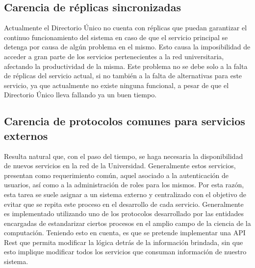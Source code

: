 \subsection{Carencia de r\'eplicas sincronizadas }

Actualmente el Directorio \'Unico no cuenta con r\'eplicas que puedan garantizar el continuo funcionamiento del sistema en caso de que el servicio principal se detenga por causa de alg\'un problema en el mismo. Esto causa la imposibilidad de acceder a gran parte de los servicios pertenecientes a la red universitaria, afectando la productividad de la misma.
Este problema no se debe solo a la falta de r\'eplicas del servicio actual, si no tambi\'en a la falta de alternativas para este servicio, ya que actualmente no existe ninguna funcional, a pesar de que el Directorio \'Unico lleva fallando ya un buen tiempo.

\subsection{Carencia de protocolos comunes para servicios externos}

Resulta natural que, con el paso del tiempo, se haga necesaria la disponibilidad de nuevos servicios en la red de la Universidad. Generalmente estos servicios, presentan como requerimiento com\'un, aquel asociado a la autenticaci\'on de usuarios, as\'i como a la administraci\'on de roles para los mismos. Por esta raz\'on, esta tarea se suele asignar a un sistema externo y centralizado con el objetivo de evitar que se repita este proceso en el desarrollo de cada servicio. Generalmente es implementado utilizando uno de los protocolos desarrollado por las entidades encargadas de estandarizar ciertos procesos en el amplio campo de la ciencia de la computaci\'on. Teniendo esto en cuenta, es que se pretende implementar una API Rest que permita modificar la l\'ogica detr\'as de la informaci\'on brindada, sin que esto implique modificar todos los servicios que consuman informaci\'on de nuestro sistema.





